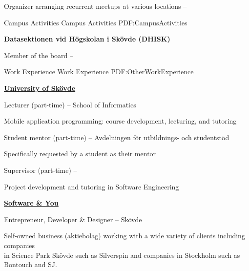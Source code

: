 \documentclass[letterpaper,MMMyyyy,nonstopmode]{simpleresumecv}
\begin{document}
\begin{Body}
\Gap
\BulletItem
Organizer arranging recurrent meetups at various locations
\hfill
{} -- 


\Section
{Campus Activities}
{Campus Activities}
{PDF:CampusActivities}

\Entry
\textbf{Datasektionen vid Högskolan i Skövde (DHISK)}

\Gap
\BulletItem
Member of the board
\hfill
{} -- 


\Section
{Work Experience}
{Work Experience}
{PDF:OtherWorkExperience}

\Entry
\href{http://his.se}
{\textbf{University of Skövde}}

\Gap
\BulletItem
Lecturer (part-time)
\hfill
{} --
\newline
School of Informatics
\begin{Detail}
\SubBulletItem
Mobile application programming: course development, lecturing, and tutoring
\end{Detail}

\Gap
\BulletItem
Student mentor (part-time)
\hfill
{} --
\newline
Avdelningen för utbildnings- och studentstöd
\begin{Detail}
\SubBulletItem
Specifically requested by a student as their mentor
\end{Detail}

\Gap
\BulletItem
Supervisor (part-time)
\hfill
{} --
\begin{Detail}
\SubBulletItem
Project development and tutoring in Software Engineering
\end{Detail}

\BigGap
\Entry
\href{http://softwareyou.se/}
{\textbf{Software \& You}}

\Gap
\BulletItem
Entrepreneur, Developer \& Designer
\hfill
{} --
\newline
Skövde
\begin{Detail}
\SubBulletItem
Self-owned business (aktiebolag) working with a wide variety of clients including companies\\in Science Park Skövde such as Silverspin and companies in Stockholm such as Bontouch and SJ. 
\end{Detail}


\end{Body}
\end{document}
